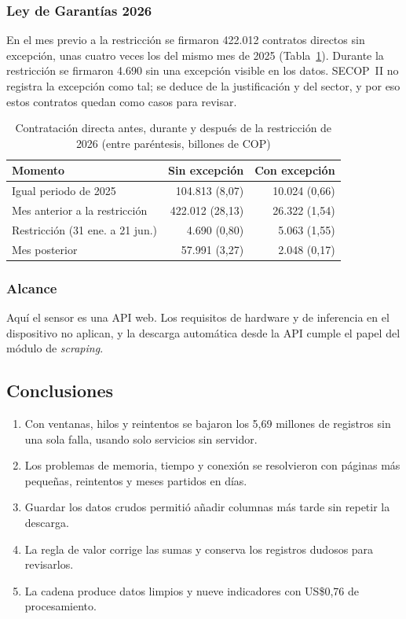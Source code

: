 \subsubsection{Ley de Garantías 2026}

En el mes previo a la restricción se firmaron 422.012 contratos directos sin excepción, unas cuatro veces los del mismo mes de 2025 (Tabla~\ref{adq:t8}). Durante la restricción se firmaron 4.690 sin una excepción visible en los datos. SECOP~II no registra la excepción como tal; se deduce de la justificación y del sector, y por eso estos contratos quedan como casos para revisar.

\begin{table}[!htbp]
\centering
\small
\caption{Contratación directa antes, durante y después de la restricción de 2026 (entre paréntesis, billones de COP)}\label{adq:t8}
\footnotesize
\setlength{\tabcolsep}{3pt}
\begin{tabular}{@{}lrr@{}}
\toprule
Momento & Sin excepción & Con excepción \\
\midrule
Igual periodo de 2025 & 104.813 (8,07) & 10.024 (0,66) \\
Mes anterior a la restricción & 422.012 (28,13) & 26.322 (1,54) \\
Restricción (31 ene. a 21 jun.) & 4.690 (0,80) & 5.063 (1,55) \\
Mes posterior & 57.991 (3,27) & 2.048 (0,17) \\
\bottomrule
\end{tabular}
\end{table}

\subsubsection{Alcance}

Aquí el sensor es una API web. Los requisitos de hardware y de inferencia en el dispositivo no aplican, y la descarga automática desde la API cumple el papel del módulo de \emph{scraping}.

\subsection{Conclusiones}

\begin{enumerate}
\item Con ventanas, hilos y reintentos se bajaron los 5,69 millones de registros sin una sola falla, usando solo servicios sin servidor.
\item Los problemas de memoria, tiempo y conexión se resolvieron con páginas más pequeñas, reintentos y meses partidos en días.
\item Guardar los datos crudos permitió añadir columnas más tarde sin repetir la descarga.
\item La regla de valor corrige las sumas y conserva los registros dudosos para revisarlos.
\item La cadena produce datos limpios y nueve indicadores con US\$0,76 de procesamiento.
\end{enumerate}
